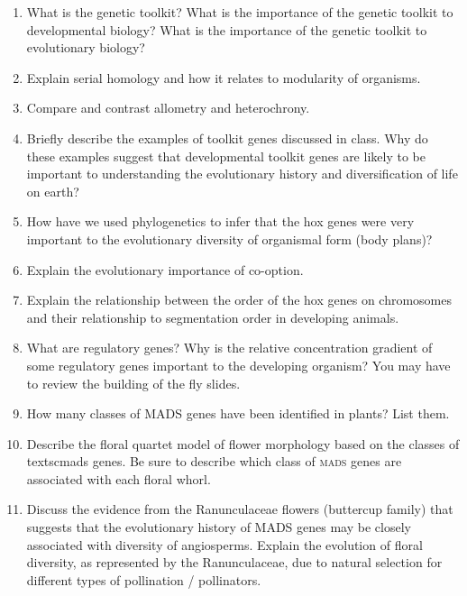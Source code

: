 \documentclass[letterpaper]{tufte-handout}
\begin{document}
\begin{enumerate}
	
	\item What is the genetic toolkit?  What is the importance of the genetic toolkit to developmental biology?  What is the importance of the genetic toolkit to evolutionary biology?  
	
	\item Explain serial homology and how it relates to modularity of organisms.
	
	\item Compare and contrast allometry and heterochrony.

	\item Briefly describe the examples of toolkit genes discussed in class. Why do these examples suggest that developmental toolkit genes are likely to be important to understanding the evolutionary history and diversification of life on earth?

	\item How have we used phylogenetics to infer that the hox genes were very important to the evolutionary diversity of organismal form (body plans)?

	\item Explain the evolutionary importance of co-option.

	\item Explain the relationship between the order of the hox genes on chromosomes and their relationship to segmentation order in developing animals.

	\item What are regulatory genes?  Why is the relative concentration gradient of some regulatory genes important to the developing organism?  You may have to review the building of the fly slides.
	
		\item How many classes of MADS genes have been identified in plants?  List them.
	
		\item Describe the floral quartet model of flower morphology based on the classes of textsc{mads} genes.  Be sure to describe which class of \textsc{mads} genes are associated with each floral whorl.
	
		\item Discuss the evidence from the Ranunculaceae flowers (buttercup family) that suggests that the evolutionary history of MADS genes may be closely associated with diversity of angiosperms.  Explain the evolution of floral diversity, as represented by the Ranunculaceae, due to natural selection for different types of pollination / pollinators.
	
\end{enumerate}
\end{document}
